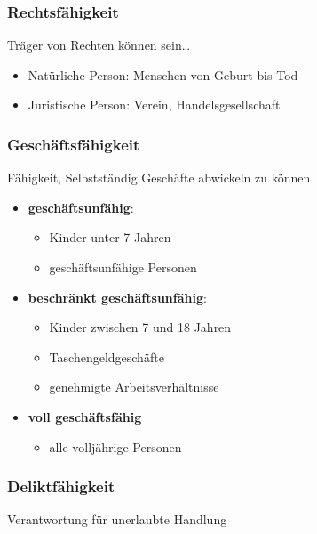 \subsubsection{Rechtsfähigkeit}

Träger von Rechten können sein\dots

\begin{itemize}
	\item Natürliche Person: Menschen von Geburt bis Tod 
	\item Juristische Person: Verein, Handelsgesellschaft
\end{itemize}
	
\subsubsection{Geschäftsfähigkeit}

Fähigkeit, Selbstständig Geschäfte abwickeln zu können

\begin{itemize}
	\item \textbf{geschäftsunfähig}: 
	\begin{itemize}
		\item Kinder unter 7 Jahren 
		\item geschäftsunfähige Personen
	\end{itemize}
	\item \textbf{beschränkt geschäftsunfähig}:
	\begin{itemize}
		\item Kinder zwischen 7 und 18 Jahren
		\item Taschengeldgeschäfte
		\item genehmigte Arbeitsverhältnisse
	\end{itemize}
	\item\textbf{voll geschäftsfähig}
	\begin{itemize}
		\item alle volljährige Personen
	\end{itemize}
\end{itemize}
    
\subsubsection{Deliktfähigkeit}

Verantwortung für unerlaubte Handlung

